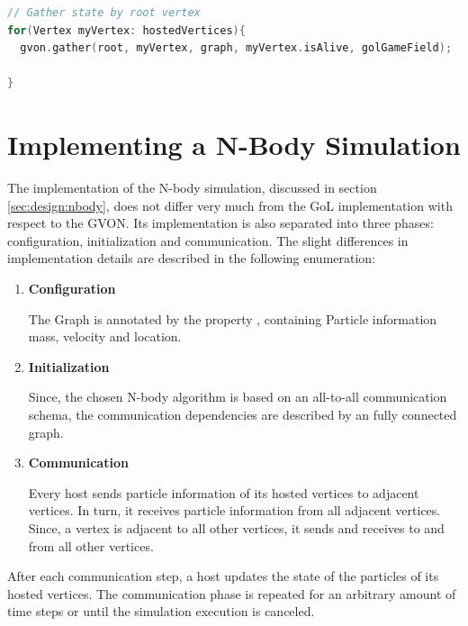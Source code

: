 \begin{lstlisting}[language=C++, label=lst:gol_gather, caption={\ } ]
// Gather state by root vertex
for(Vertex myVertex: hostedVertices){
  gvon.gather(root, myVertex, graph, myVertex.isAlive, golGameField);

}
\end{lstlisting}


\section{Implementing a N-Body Simulation}
\label{sec:impl:nbody}


The implementation of the N-body simulation, discussed in section
\ref{sec:design:nbody}, does not differ very much from the GoL
implementation with respect to the GVON. Its implementation is
also separated into three phases: configuration, initialization and
communication. The slight differences in implementation details are
described in the following enumeration:

\begin{enumerate}
\item \textbf{Configuration}

  The Graph is annotated by the property
  , containing Particle information mass, velocity and
  location.

\item \textbf{Initialization}

  Since, the chosen N-body algorithm is
  based on an all-to-all communication schema, the communication
  dependencies are described by an fully connected graph.

\item \textbf{Communication}

  Every host sends particle information
  of its hosted vertices to adjacent vertices. In turn, it receives
  particle information from all adjacent vertices. Since, a vertex is
  adjacent to all other vertices, it sends and receives to and from
  all other vertices.
\end{enumerate}

\noindent After each communication step, a host updates the state of
the particles of its hosted vertices.  The communication phase is
repeated for an arbitrary amount of time steps or until the simulation
execution is canceled.

